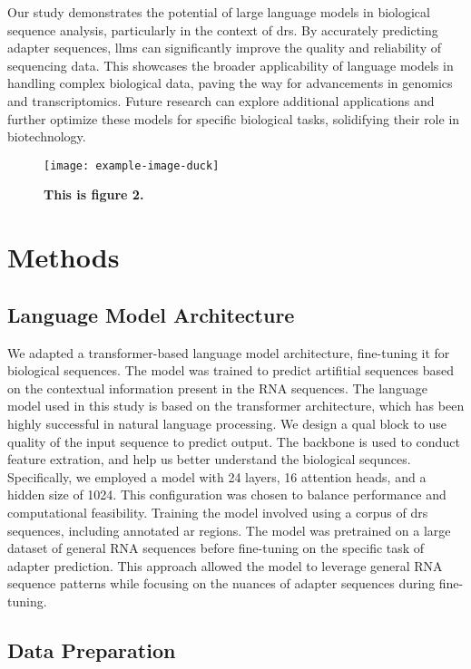 \documentclass[pdflatex, sn-mathphys-num, lineno]{sn-jnl}%
\theoremstyle{thmstyleone}%
\theoremstyle{thmstyletwo}%
\theoremstyle{thmstylethree}%
\begin{document}
Our study demonstrates the potential of large language models in biological sequence analysis, particularly in the context of \gls{drs}.
By accurately predicting adapter sequences,  \glspl{llm} can significantly improve the quality and reliability of sequencing data.
This showcases the broader applicability of language models in handling complex biological data, paving the way for advancements in genomics and transcriptomics.
Future research can explore additional applications and further optimize these models for specific biological tasks, solidifying their role in biotechnology.

\begin{figure}[!h]
	\texttt{[image: example-image-duck]}
	\caption{\bf This is figure 2.}
	\label{fig:f2}
\end{figure}

\section{Methods}\label{sec:methods}

\subsection{Language Model Architecture}\label{ssec:lm}

We adapted a transformer-based language model architecture, fine-tuning it for biological sequences.
The model was trained to predict  artifitial sequences based on the contextual information present in the RNA sequences.
The language model used in this study is based on the transformer architecture, which has been highly successful in natural language processing.
We design a qual block to use quality of the input sequence to predict output.
The backbone is used to conduct feature extration, and help us better understand the biological sequnces.
Specifically, we employed a model with \num{24} layers, \num{16} attention heads, and a hidden size of \num{1024}.
This configuration was chosen to balance performance and computational feasibility.
Training the model involved using a corpus of \gls{drs} sequences, including annotated ar regions.
The model was pretrained on a large dataset of general RNA sequences before fine-tuning on the specific task of adapter prediction.
This approach allowed the model to leverage general RNA sequence patterns while focusing on the nuances of adapter sequences during fine-tuning.

\subsection{Data Preparation}\label{ssec:data}
\end{document}
